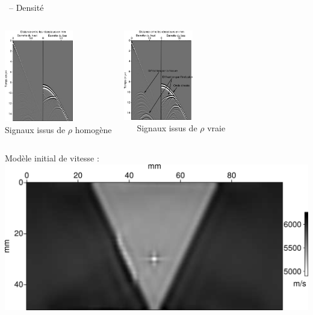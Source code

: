 \documentclass[10pt,xcolor=x11names,compress, notes=show]{beamer}%
\begin{document}
\subsection*{}
\begin{frame}{\insertsectionhead~-- Densité}
\begin{footnotesize}

		\centering
		\begin{columns}
			\raggedleft
			\includegraphics[width=3cm]{img/rho_mono/data_rho_uni.png}\\
			Signaux issus de $\rho$ homogène\hspace{-0.5cm}
			\raggedright
			\includegraphics[width=3cm]{img/rho_mono/data_rho_vrai.png}\\
			~~~Signaux issus de $\rho$ vraie
		\end{columns}		
		\vfill
		
		\begin{columns}
			\column{0.35\textwidth}	
			\centering
			Modèle initial de vitesse : \\[0.2cm]
			\includegraphics[width=\textwidth]{img/vp_mono_smooth/vp_smooth.png}\\
			

\end{columns}
\end{footnotesize}
\end{frame}
\end{document}
